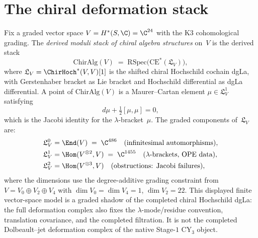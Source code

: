 \section{The chiral deformation stack}
\label{sec:chiral-deformation-stack}

Fix a graded vector space $V = H^*(S, \C) = \C^{24}$ with the K3 cohomological grading. The \emph{derived moduli stack of chiral algebra structures} on~$V$ is the derived stack
\[
 \mathrm{ChirAlg}(V) \;=\; \mathrm{RSpec}\bigl(\mathrm{CE}^*(\mathfrak{L}_V)\bigr),
\]
where $\mathfrak{L}_V = \ChirHoch^*(V, V)[1]$ is the shifted chiral Hochschild cochain dgLa, with Gerstenhaber bracket as Lie bracket and Hochschild differential as dgLa differential. A point of $\mathrm{ChirAlg}(V)$ is a Maurer--Cartan element $\mu \in \mathfrak{L}_V^1$ satisfying
\[
 d\mu + \tfrac{1}{2}[\mu, \mu] = 0,
\]
which is the Jacobi identity for the $\lambda$-bracket~$\mu$. The graded components of~$\mathfrak{L}_V$ are:
\begin{align*}
 \mathfrak{L}_V^0 &= \End(V) \;=\; \C^{486} \quad\text{(infinitesimal automorphisms)}, \\
 \mathfrak{L}_V^1 &= \Hom(V^{\otimes 2}, V) \;=\; \C^{1455} \quad\text{($\lambda$-brackets, OPE data)}, \\
 \mathfrak{L}_V^2 &= \Hom(V^{\otimes 3}, V) \quad\text{(obstructions: Jacobi failures)},
\end{align*}
where the dimensions use the degree-additive grading constraint from $V = V_0 \oplus V_2 \oplus V_4$ with $\dim V_0 = \dim V_4 = 1$, $\dim V_2 = 22$.
This displayed finite vector-space model is a graded shadow of the
completed chiral Hochschild dgLa: the full deformation complex also fixes
the $\lambda$-mode/residue convention, translation covariance, and the
completed filtration. It is not the completed Dolbeault--jet deformation
complex of the native Stage-$1$ CY$_3$ object.

